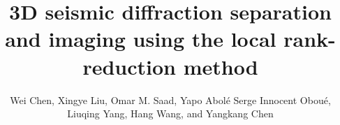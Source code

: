 %


%


\DeclareRobustCommand{\dlo}[1]{}
\DeclareRobustCommand{\wen}[1]{#1}

\title{3D seismic diffraction separation and imaging using the local rank-reduction method}
\renewcommand{\thefootnote}{\fnsymbol{footnote}}
\author{Wei Chen, Xingye Liu, Omar M. Saad, Yapo Abol{\'e} Serge Innocent Obou{\'e}, Liuqing Yang, Hang Wang, and Yangkang Chen}

\maketitle

